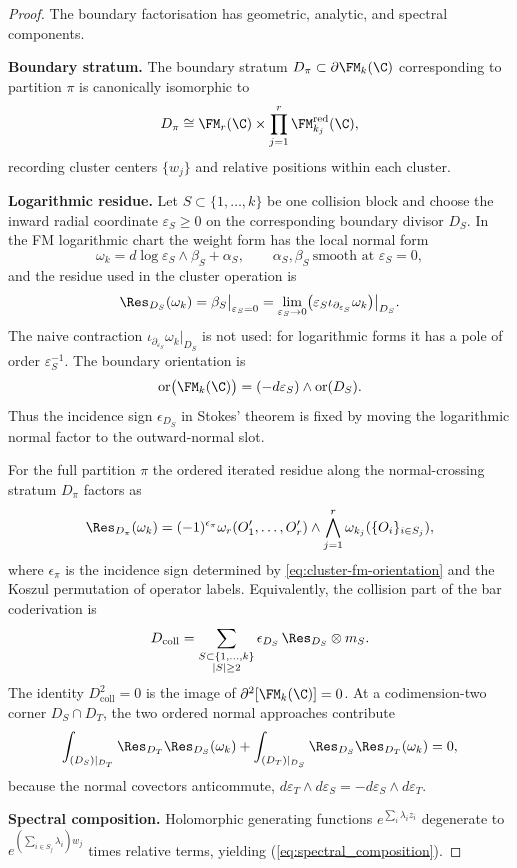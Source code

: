 \begin{proof}
The boundary factorisation has geometric, analytic, and spectral
components.

\textbf{Boundary stratum.} The boundary stratum $D_\pi \subset \partial \FM_k(\C)$ corresponding to partition $\pi$ is canonically isomorphic to
\[
D_\pi \cong \FM_r(\C) \times \prod_{j=1}^r
\FM_{k_j}^{\mathrm{red}}(\C),
\]
recording cluster centers $\{w_j\}$ and relative positions within each cluster.

\textbf{Logarithmic residue.} Let $S\subset\{1,\ldots,k\}$ be one
collision block and choose the inward radial coordinate
$\varepsilon_S\geq0$ on the corresponding boundary divisor
$D_S$.  In the FM logarithmic chart the weight form has the local
normal form
\[
\omega_k=d\log\varepsilon_S\wedge\beta_S+\alpha_S,
\qquad
\alpha_S,\beta_S\ \text{smooth at }\varepsilon_S=0,
\]
and the residue used in the cluster operation is
\begin{equation}
\label{eq:cluster-fm-residue}
\Res_{D_S}(\omega_k)=\beta_S\big|_{\varepsilon_S=0}
=
\lim_{\varepsilon_S\to0}
\bigl(\varepsilon_S\iota_{\partial_{\varepsilon_S}}\omega_k\bigr)
\big|_{D_S}.
\end{equation}
The naive contraction
$\iota_{\partial_{\varepsilon_S}}\omega_k|_{D_S}$ is not used: for
logarithmic forms it has a pole of order $\varepsilon_S^{-1}$.
The boundary orientation is
\begin{equation}
\label{eq:cluster-fm-orientation}
\operatorname{or}\bigl(\FM_k(\C)\bigr)
=(-d\varepsilon_S)\wedge\operatorname{or}(D_S).
\end{equation}
Thus the incidence sign $\epsilon_{D_S}$ in Stokes' theorem is fixed
by moving the logarithmic normal factor to the outward-normal slot.

For the full partition $\pi$ the ordered iterated residue along the
normal-crossing stratum $D_\pi$ factors as
\[
\Res_{D_\pi}(\omega_k)
=
(-1)^{\epsilon_\pi}
\omega_r(O'_1,\ldots,O'_r) \wedge
\bigwedge_{j=1}^r \omega_{k_j}(\{O_i\}_{i \in S_j}),
\]
where $\epsilon_\pi$ is the incidence sign determined by
\eqref{eq:cluster-fm-orientation} and the Koszul permutation of
operator labels.  Equivalently, the collision part of the bar
coderivation is
\begin{equation}
\label{eq:cluster-collision-differential}
D_{\mathrm{coll}}
=
\sum_{\substack{S\subset\{1,\ldots,k\}\\ |S|\ge2}}
\epsilon_{D_S}\,\Res_{D_S}\otimes m_S .
\end{equation}
The identity $D_{\mathrm{coll}}^2=0$ is the image of
$\partial^2[\FM_k(\C)]=0$.  At a codimension-two corner
$D_S\cap D_T$, the two ordered normal approaches contribute
\[
\int_{(D_S)|_{D_T}}\Res_{D_T}\Res_{D_S}(\omega_k)
+
\int_{(D_T)|_{D_S}}\Res_{D_S}\Res_{D_T}(\omega_k)=0,
\]
because the normal covectors anticommute,
$d\varepsilon_T\wedge d\varepsilon_S
=-d\varepsilon_S\wedge d\varepsilon_T$.

\textbf{Spectral composition.} Holomorphic generating functions $e^{\sum_i \lambda_i z_i}$ degenerate to $e^{(\sum_{i \in S_j} \lambda_i) w_j}$ times relative terms, yielding (\ref{eq:spectral_composition}).
\end{proof}


